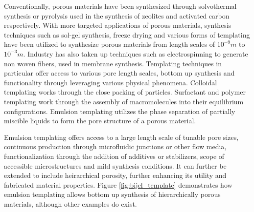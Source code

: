 Conventionally, porous materials have been synthesized through solvothermal synthesis or pyrolysis used in the synthesis of zeolites and 
activated carbon respectively. With more targeted applications of porous materials, synthesis techniques such as sol-gel synthesis, 
freeze drying and various forms of templating have been utilized to synthesize porous materials from length scales of $10^{-9}m$ to 
$10^{-3}m$. \cite{stein_morphological_2008, ray_comprehensive_2016, cervellere_mesoscopic_2019, garcia-bennett_unique_2020, zhang_emulsion_2019, 
alves-rosa_design_2013} Industry has also taken up techniques such as electrospinning to generate non woven fibers, used in membrane synthesis. 
Templating techniques in particular offer access to various pore length scales, bottom up synthesis and functionality through leveraging various 
physical phenomena. Colloidal templating works through the close packing of particles. Surfactant and polymer templating work through the 
assembly of macromolecules into their equilibrium configurations. Emulsion templating utilizes the phase separation of partially miscible 
liquids to form the pore structure of a porous material. 

Emulsion templating offers access to a large length scale of tunable pore sizes, continuous production through microfluidic junctions or 
other flow media, functionalization through the addition of additives or stabilizers, scope of accessible microstructures and mild synthesis 
conditions. It can further be extended to include heirarchical porosity, further enhancing its utility and fabricated material properties. 
\cite{yang_hierarchically_2017, thompson_hierarchically_2019, wang_morphology_2023} Figure \ref{fig:bijel_template} demonstrates how emulsion 
templating allows bottom up synthesis of hierarchically porous materials, although other examples do exist. 
\cite{garcia_scalable_2019, santiago_cordoba_aerobijels_2020, thorson_bijel-templated_2019, lu_controllable_2020, wang_morphology_2023}

